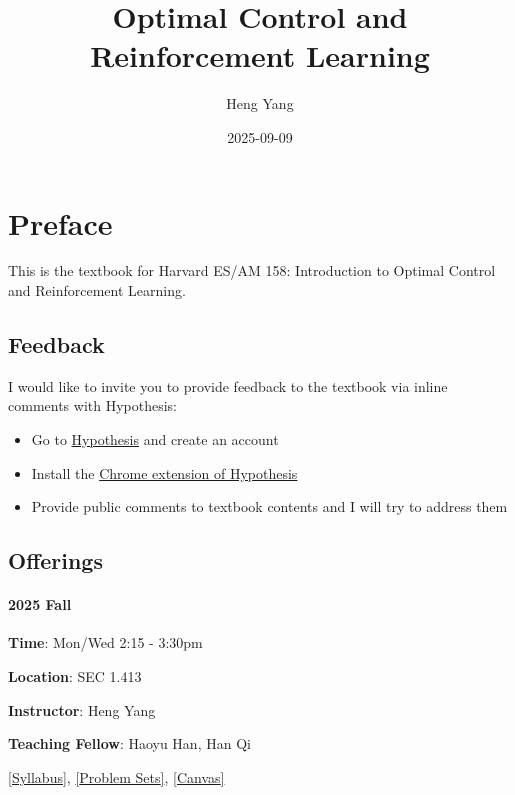 \documentclass[
]{book}
\title{Optimal Control and Reinforcement Learning}
\author{Heng Yang}
\date{2025-09-09}
\theoremstyle{definition}
\theoremstyle{definition}
\theoremstyle{definition}
\theoremstyle{definition}
\theoremstyle{remark}
\begin{document}
\maketitle

{
\setcounter{tocdepth}{1}
\tableofcontents
}
\chapter*{Preface}\label{preface}

This is the textbook for Harvard ES/AM 158: Introduction to Optimal Control and Reinforcement Learning.

\section*{Feedback}\label{feedback}

I would like to invite you to provide feedback to the textbook via inline comments with Hypothesis:

\begin{itemize}
\item
  Go to \href{https://hypothes.is}{Hypothesis} and create an account
\item
  Install the \href{https://chrome.google.com/webstore/detail/hypothesis-web-pdf-annota/bjfhmglciegochdpefhhlphglcehbmek}{Chrome extension of Hypothesis}
\item
  Provide public comments to textbook contents and I will try to address them
\end{itemize}

\section*{Offerings}\label{offerings}

\subsubsection*{2025 Fall}\label{fall}

\textbf{Time}: Mon/Wed 2:15 - 3:30pm

\textbf{Location}: SEC 1.413

\textbf{Instructor}: Heng Yang

\textbf{Teaching Fellow}: Haoyu Han, Han Qi

\href{https://docs.google.com/document/d/1dIRYQZZJDx8K2q1TrodDDLg-bKJWWmj7o7yzOGlIs7o/edit?usp=sharing}{{[}Syllabus{]}}, \href{https://github.com/ComputationalRobotics/2025-ES-AM-158-PSET}{{[}Problem Sets{]}}, \href{https://canvas.harvard.edu/courses/153422}{{[}Canvas{]}}
\end{document}
